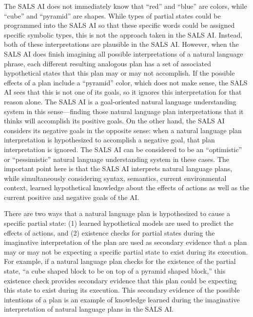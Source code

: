 The SALS AI does not immediately know that ``red'' and ``blue'' are
colors, while ``cube'' and ``pyramid'' are shapes.  While types of
partial states could be programmed into the SALS AI so that these
specific words could be assigned specific symbolic types, this is not
the approach taken in the SALS AI.  Instead, both of these
interpretations are plausible in the SALS AI.  However, when the SALS
AI does finish imagining all possible interpretations of a natural
language phrase, each different resulting analogous plan has a set of
associated hypothetical states that this plan may or may not
accomplish.  If the possible effects of a plan include a ``pyramid''
color, which does not make sense, the SALS AI sees that this is not
one of its goals, so it ignores this interpretation for that reason
alone.  The SALS AI is a goal-oriented natural language understanding
system in this sense---finding those natural language plan
interpretations that it thinks will accomplish its positive goals.  On
the other hand, the SALS AI considers its negative goals in the
opposite sense: when a natural language plan interpretation is
hypothesized to accomplish a negative goal, that plan interpretation
is ignored.  The SALS AI can be considered to be an ``optimistic'' or
``pessimistic'' natural language understanding system in these cases.
The important point here is that the SALS AI interprets natural
language plans, while simultaneously considering syntax, semantics,
current environmental context, learned hypothetical knowledge about
the effects of actions as well as the current positive and negative
goals of the AI.

There are two ways that a natural language plan is hypothesized to
cause a specific partial state: (1) learned hypothetical models are
used to predict the effects of actions, and (2) existence checks for
partial states during the imaginative interpretation of the plan are
used as secondary evidence that a plan may or may not be expecting a
specific partial state to exist during its execution.  For example, if
a natural language plan checks for the existence of the partial state,
``a cube shaped block to be on top of a pyramid shaped block,'' this
existence check provides secondary evidence that this plan could be
expecting this state to exist during its execution.  This secondary
evidence of the possible intentions of a plan is an example of
knowledge learned during the imaginative interpretation of natural
language plans in the SALS AI.


